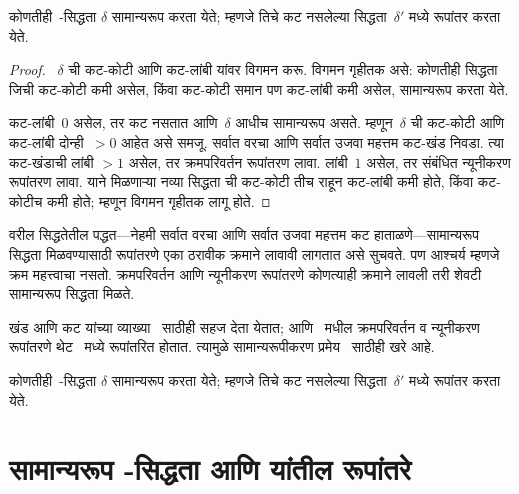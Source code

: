 \begin{thm}\label{pt:nor:thm:thm:normalization}
कोणतीही~-सिद्धता
$\delta$ सामान्यरूप करता
येते; म्हणजे तिचे कट
नसलेल्या सिद्धता~$\delta'$
मध्ये रूपांतर करता येते.
\end{thm}

\begin{proof}
  ~$\delta$ ची कट-कोटी
  आणि कट-लांबी यांवर
  विगमन करू. विगमन
  गृहीतक असे: कोणतीही
  सिद्धता जिची
  कट-कोटी कमी असेल,
  किंवा कट-कोटी समान
  पण कट-लांबी कमी असेल,
  सामान्यरूप करता येते.

  कट-लांबी~$0$
  असेल, तर कट नसतात
  आणि~$\delta$ आधीच
  सामान्यरूप असते.
  म्हणून~$\delta$ ची
  कट-कोटी आणि कट-लांबी
  दोन्ही~$>0$ आहेत असे
  समजू. सर्वात वरचा
  आणि सर्वात उजवा
  महत्तम कट-खंड निवडा.
  त्या कट-खंडाची लांबी
  $>1$ असेल, तर
  क्रमपरिवर्तन रूपांतरण
  लावा. लांबी~$1$
  असेल, तर संबंधित
  न्यूनीकरण रूपांतरण लावा.
  याने मिळणाऱ्या नव्या
  सिद्धता ची कट-कोटी
  तीच राहून कट-लांबी
  कमी होते, किंवा
  कट-कोटीच कमी होते;
  म्हणून विगमन गृहीतक
  लागू होते.
\end{proof}

वरील सिद्धतेतील
पद्धत—नेहमी सर्वात
वरचा आणि सर्वात
उजवा महत्तम कट
हाताळणे—सामान्यरूप
सिद्धता मिळवण्यासाठी
रूपांतरणे एका ठरावीक
क्रमाने लावावी लागतात
असे सुचवते. पण आश्चर्य
म्हणजे क्रम महत्त्वाचा
नसतो. क्रमपरिवर्तन आणि
न्यूनीकरण रूपांतरणे
कोणत्याही क्रमाने
लावली तरी शेवटी
सामान्यरूप सिद्धता
मिळते.

खंड आणि कट यांच्या
व्याख्या~
साठीही सहज देता येतात;
आणि~ मधील
क्रमपरिवर्तन व न्यूनीकरण
रूपांतरणे थेट~
मध्ये रूपांतरित होतात.
त्यामुळे सामान्यरूपीकरण
प्रमेय~ साठीही
खरे आहे.

\begin{thm}\label{pt:nor:thm:thm:normalization-N2i}
कोणतीही~-सिद्धता
$\delta$ सामान्यरूप करता
येते; म्हणजे तिचे कट
नसलेल्या सिद्धता~$\delta'$
मध्ये रूपांतर करता येते.
\end{thm}















\section{सामान्यरूप -सिद्धता आणि  यांतील रूपांतरे}\label{pt:nor:tr:sec}

